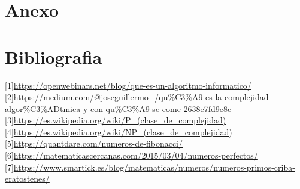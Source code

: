 \documentclass[spanish]{article}
\begin{document}
		\section{Anexo}			
		\section{Bibliografia}
		{[}1{]}\url{https://openwebinars.net/blog/que-es-un-algoritmo-informatico/}\\
		{[}2{]}\url{https://medium.com/@joseguillermo_/qu%C3%A9-es-la-complejidad-algor%C3%ADtmica-y-con-qu%C3%A9-se-come-2638e7fd9e8c}\\
		{[}3{]}\url{https://es.wikipedia.org/wiki/P_(clase_de_complejidad)}\\
		{[}4{]}\url{https://es.wikipedia.org/wiki/NP_(clase_de_complejidad)}\\
		{[}5{]}\url{https://quantdare.com/numeros-de-fibonacci/}\\
		{[}6{]}\url{https://matematicascercanas.com/2015/03/04/numeros-perfectos/}\\
		{[}7{]}\url{https://www.smartick.es/blog/matematicas/numeros/numeros-primos-criba-eratostenes/}\\		
\end{document}
